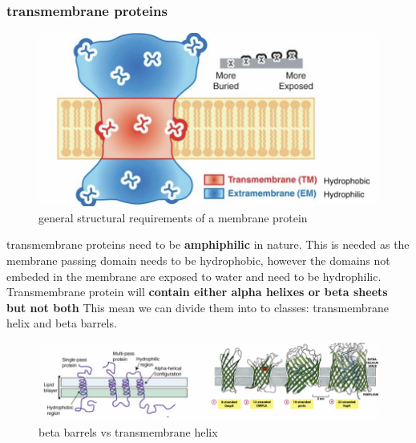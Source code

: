 \documentclass[../main.tex]{subfiles}
\begin{document}
\subsubsection{transmembrane proteins}

\begin{figure}[H]
    \centering
    \includegraphics[width=0.5\linewidth]{MP_structure_overview.png}
    \caption{general structural requirements of a membrane protein}
    \label{fig:MP_struct_overview}
\end{figure}


transmembrane proteins need to be \textbf{\gls{amphiphilic}} in nature. This is needed as the membrane passing domain needs to be hydrophobic, however the domains not embeded in the membrane are exposed to water and need to be hydrophilic. Transmembrane protein will \textbf{contain either alpha helixes or beta sheets but not both} This mean we can divide them into to classes: transmembrane helix and beta barrels.
\begin{figure}[H]
    \centering
    \includegraphics[width=\linewidth]{A_B.png}
    \caption{beta barrels vs transmembrane helix}
    \label{fig:enter-label}
\end{figure}
\end{document}
